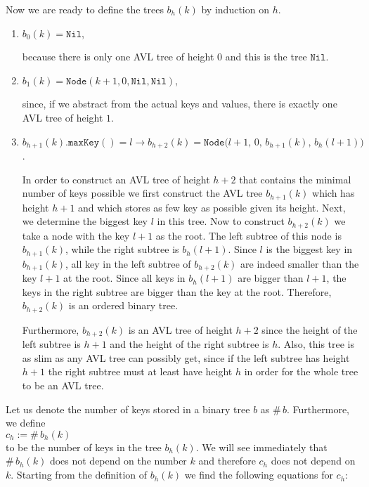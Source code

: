 Now we are ready to define the trees  $b_h(k)$ by induction on  $h$.
\begin{enumerate}
\item $b_0(k) = \mathtt{Nil}$,

      because there is only one AVL tree of height $0$ and this is the tree $\mathtt{Nil}$.
\item $b_1(k) = \mathtt{Node}(k+1,0,\mathtt{Nil}, \mathtt{Nil})$,

      since, if we abstract from the actual keys and values, there is exactly one AVL tree of height
      $1$.
\item $b_{h+1}(k).\mathtt{maxKey}() = l \rightarrow 
       b_{h+2}(k) = \mathtt{Node}\bigl(l+1,\,0,\,b_{h+1}(k),\,b_h(l+1)\bigr)$.

      In order to construct an AVL tree of height $h+2$ that contains the minimal number of keys 
      possible we first construct the AVL tree $b_{h+1}(k)$ which has height  $h+1$ and which stores as few
      key as possible given its height.  Next, we determine the biggest key $l$ in this tree. 
      Now to construct $b_{h+2}(k)$ we take a node with the key $l+1$ as the root.
      The left subtree of this node is $b_{h+1}(k)$, while the right subtree is $b_h(l+1)$.
      Since $l$ is the biggest key in $b_{h+1}(k)$, all key in the left subtree of
      $b_{h+2}(k)$ are indeed smaller than the key $l+1$ at the root.  Since all keys in
      $b_h(l+1)$ are bigger than $l+1$, the keys in the right subtree are bigger than the key at the
      root.  Therefore, $b_{h+2}(k)$ is an ordered binary tree.

      Furthermore, $b_{h+2}(k)$ is an AVL tree of height $h+2$ since the height of the left subtree
      is $h+1$ and the height of the right subtree is $h$.  Also, this tree is as slim as
      any AVL tree can possibly get, since if the left subtree has height $h+1$ the right subtree
      must at least have height $h$ in order for the whole tree to be an AVL tree.
\end{enumerate}
Let us denote the number of keys stored in a binary tree $b$ as  $\#\,b$.  Furthermore, we define
\\[0.2cm]
\hspace*{1.3cm}
$c_h := \#\, b_h(k)$
\\[0.2cm]
to be the number of keys in the tree $b_h(k)$.  We will see immediately that 
$\#\,b_h(k)$ does not depend on the number $k$ and therefore $c_h$ does not depend on $k$.  Starting
from the definition of $b_h(k)$ we find the following equations for $c_h$:
